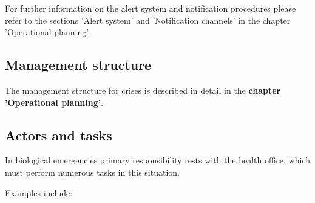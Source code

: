 \documentclass{article}
\begin{document}
For further information on the alert system and notification procedures please refer to the sections 'Alert system' and 'Notification channels' in the chapter 'Operational planning'.


\subsection{Management structure}\label{H6395498}



The management structure for crises is described in detail in the \textbf{chapter 'Operational planning'}.


\subsection{Actors and tasks}\label{H6544336}



In biological emergencies primary responsibility rests with the health office, which must perform numerous tasks in this situation.


Examples include:
\end{document}
